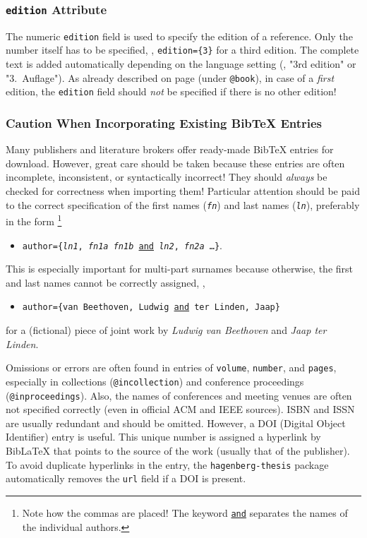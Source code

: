 \subsubsection{\texttt{edition} Attribute}

The numeric \texttt{edition} field is used to specify the edition of a
reference. Only the number itself has to be specified, \eg, \verb!edition={3}!
for a third edition. The complete text is added automatically depending on the
language setting (\eg, "3rd edition" or "3.\ Auflage"). As already described on
page \pageref{sec:@book} (under \texttt{@book}), in case of a
\emph{first} edition, the \texttt{edition} field should
\emph{not} be specified if there is no other edition!

\subsubsection{Caution When Incorporating Existing BibTeX Entries}

Many publishers and literature brokers offer ready-made BibTeX entries for
download. However, great care should be taken because these entries are often
incomplete, inconsistent, or syntactically incorrect! They should \emph{always}
be checked for correctness when importing them! Particular attention should be
paid to the correct specification of the first names (\texttt{\textit{fn}}) and
last names (\texttt{\textit{ln}}), preferably in the form%
\footnote{Note how the commas are placed! The keyword \underline{\texttt{and}}
separates the names of the individual authors.}
%
\begin{itemize}
\item[]
\texttt{author=\{\textit{ln1}, \textit{fn1a} \emph{fn1b} \underline{and}
\textit{ln2}, \textit{fn2a} \ldots \}}.
\end{itemize}
%
This is especially important for multi-part surnames because otherwise, the
first and last names cannot be correctly assigned, \eg,
%
\begin{itemize}
\item[]
\texttt{author=\{van Beethoven, Ludwig \underline{and} ter Linden, Jaap\}}
\end{itemize}
%
for a (fictional) piece of joint work by \emph{Ludwig van Beethoven} and \emph{Jaap ter
Linden}.

Omissions or errors are often found in entries of \texttt{volume},
\texttt{number}, and \texttt{pages}, especially in collections
(\texttt{@incollection}) and conference proceedings (\texttt{@inproceedings}).
Also, the names of conferences and meeting venues are often not specified
correctly (even in official ACM and IEEE sources). ISBN and ISSN are usually
redundant and should be omitted. However, a DOI (Digital Object Identifier)
entry is useful. This unique number is assigned a hyperlink by BibLaTeX that
points to the source of the work (usually that of the publisher). To avoid
duplicate hyperlinks in the entry, the \texttt{hagenberg-thesis} package
automatically removes the \texttt{url} field if a DOI is present.

